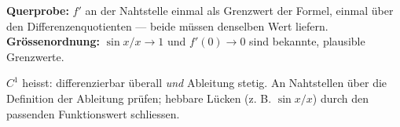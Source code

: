 \begin{kontrolle}
\textbf{Querprobe:} $f'$ an der Nahtstelle einmal als Grenzwert der Formel,
einmal über den Differenzenquotienten — beide müssen denselben Wert liefern.
\textbf{Grössenordnung:} $\sin x/x\to1$ und $f'(0)\to0$ sind bekannte,
plausible Grenzwerte.
\end{kontrolle}

\begin{merksatz}
$C^1$ heisst: differenzierbar überall \emph{und} Ableitung stetig. An
Nahtstellen über die Definition der Ableitung prüfen; hebbare Lücken
(z. B. $\sin x/x$) durch den passenden Funktionswert schliessen.
\end{merksatz}
